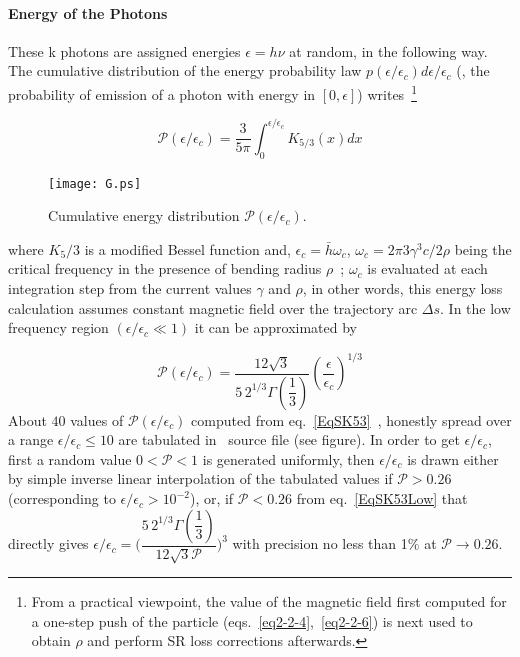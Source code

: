 \paragraph{Energy of the Photons}

These k photons are assigned energies $\epsilon=h\nu$ at random, in the following way. The cumulative 
distribution of the energy probability law $p(\epsilon/\epsilon_c)d\epsilon/\epsilon_c$  
(\ie, the probability of emission of a photon with  energy in  $[0,\epsilon]$) writes~\footnote{From 
a practical viewpoint, the value of the magnetic field first computed for a 
one-step push of the particle  (eqs.~\ref{eq2-2-4},~\ref{eq2-2-6}) is next used to  obtain  
$\rho$ and perform SR loss corrections afterwards.} 

\begin{equation}
\label{EqSK53}
\mathcal{P}(\epsilon/\epsilon_c) = \dfrac{3}{5\pi} \int_0^{\epsilon/\epsilon_c} K_{5/3}(x) dx
\end{equation}
%
\begin{figure}
  \begin{center} 
\vspace{-2mm}
\texttt{[image: G.ps]}
\vspace{-0mm}

 {\small \centering 
       Cumulative energy distribution   $\mathcal{P}(\epsilon/\epsilon_c)$. }
  \end{center}
\end{figure}
where $K_5/3$ is a modified Bessel function and, $\epsilon_c= \bar{h} \omega_c$, 
$\omega_c=2 \pi 3 \gamma^3 c / 2 \rho$ being the critical frequency  in 
the presence of bending radius $\rho$~;  $\omega_c$ is evaluated at each integration step from 
the current values $\gamma$ and $\rho$, in other words, this energy loss calculation 
assumes constant  magnetic field  over the trajectory arc $\Delta s$. 
In the low frequency region $(\epsilon/\epsilon_c \ll 1)$ it can be approximated by 

\begin{equation}
\label{EqSK53Low}
\mathcal{P}(\epsilon/\epsilon_c) = \dfrac{12 \sqrt{3}}{5\, 2^{1/3} \Gamma(\dfrac{1}{3})}  
(\dfrac{\epsilon}{\epsilon_c})^{1/3}
\end{equation}
%
\noindent  About $40$ values of $\mathcal{P}(\epsilon/\epsilon_c)$ computed from eq.~\ref{EqSK53}~\cite{VOKostroun}, 
honestly spread  over a range $\epsilon/\epsilon_c \leq 10$ are  tabulated 
in \zgoubi\ source file (see figure). In 
order to get $\epsilon/\epsilon_c$, first a random value $0<\mathcal{P}<1$ is generated uniformly, 
then  $\epsilon/\epsilon_c$ is drawn either  by simple inverse linear interpolation 
 of the tabulated values if $\mathcal{P}>0.26$ (corresponding to 
$\epsilon/\epsilon_c>10^{-2}$), 
or, if $\mathcal{P}<0.26$ from eq.~\ref{EqSK53Low} that directly gives 
 $\epsilon/\epsilon_c= \bigl( \dfrac{5 \, 2^{1/3} \Gamma(\dfrac{1}{3})}{12 \sqrt{3} \mathcal{P}}\bigr)^3$ 
 with precision no less than 1$\%$ at  $\mathcal{P}\rightarrow 0.26$. 

